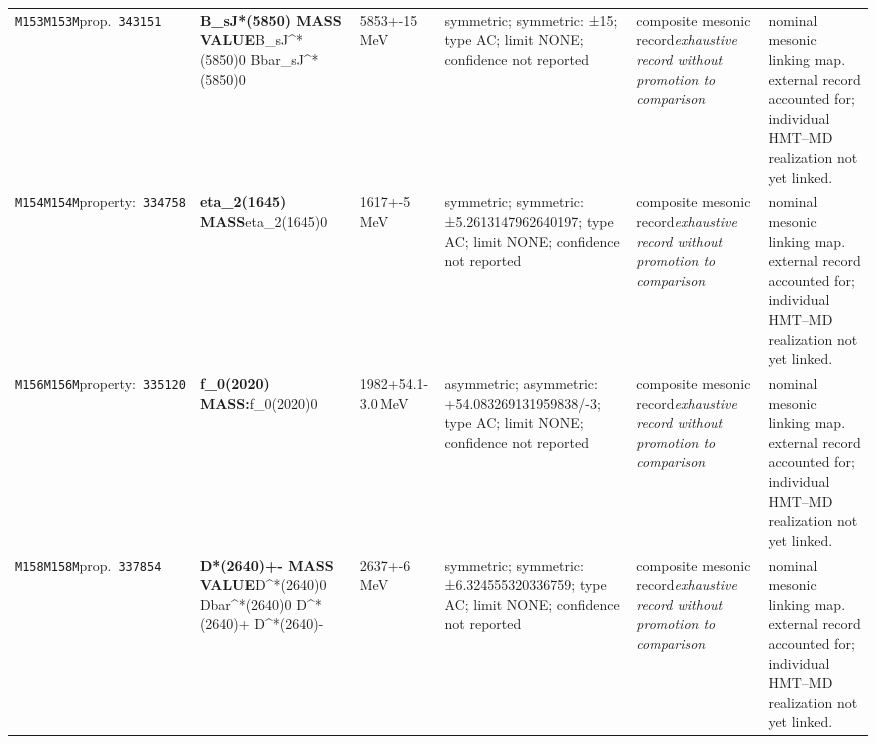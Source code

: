 \begin{landscape}
\begin{longtable}{L{1.85cm}L{4.45cm}L{2.35cm}L{4.05cm}L{3.35cm}L{7.15cm}}
\texttt{M153}\newline \texttt{M153M}\newline prop.\ \texttt{343151} & \textbf{B\_\allowbreak{}sJ*(5850) MASS VALUE}\newline B\_\allowbreak{}sJ\textasciicircum{}*(5850)0 \textbar{}\allowbreak{} Bbar\_\allowbreak{}sJ\textasciicircum{}*(5850)0 & 5853+-15\,MeV & symmetric; symmetric: ±15; type AC; limit NONE; confidence not reported & composite mesonic record\newline \emph{exhaustive record without promotion to comparison} & nominal mesonic linking map. external record accounted for; individual HMT--MD realization not yet linked. \\
\texttt{M154}\newline \texttt{M154M}\newline property:\ \texttt{334758} & \textbf{eta\_\allowbreak{}2(1645) MASS}\newline eta\_\allowbreak{}2(1645)0 & 1617+-5\,MeV & symmetric; symmetric: ±5.2613147962640197; type AC; limit NONE; confidence not reported & composite mesonic record\newline \emph{exhaustive record without promotion to comparison} & nominal mesonic linking map. external record accounted for; individual HMT--MD realization not yet linked. \\
\texttt{M156}\newline \texttt{M156M}\newline property:\ \texttt{335120} & \textbf{f\_\allowbreak{}0(2020) MASS:}\newline f\_\allowbreak{}0(2020)0 & 1982+54.1-3.0\,MeV & asymmetric; asymmetric: +54.083269131959838/-3; type AC; limit NONE; confidence not reported & composite mesonic record\newline \emph{exhaustive record without promotion to comparison} & nominal mesonic linking map. external record accounted for; individual HMT--MD realization not yet linked. \\
\texttt{M158}\newline \texttt{M158M}\newline prop.\ \texttt{337854} & \textbf{D*(2640)+- MASS VALUE}\newline D\textasciicircum{}*(2640)0 \textbar{}\allowbreak{} Dbar\textasciicircum{}*(2640)0 \textbar{}\allowbreak{} D\textasciicircum{}*(2640)+ \textbar{}\allowbreak{} D\textasciicircum{}*(2640)- & 2637+-6\,MeV & symmetric; symmetric: ±6.324555320336759; type AC; limit NONE; confidence not reported & composite mesonic record\newline \emph{exhaustive record without promotion to comparison} & nominal mesonic linking map. external record accounted for; individual HMT--MD realization not yet linked. \\

\end{longtable}
\end{landscape}
